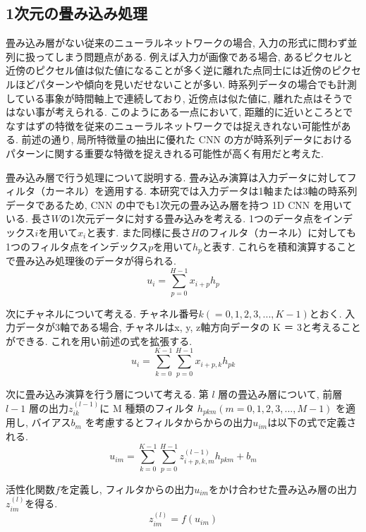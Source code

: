 \subsection{1次元の畳み込み処理}
畳み込み層がない従来のニューラルネットワークの場合, 入力の形式に問わず並列に扱ってしまう問題点がある. 例えば入力が画像である場合, あるピクセルと近傍のピクセル値は似た値になることが多く逆に離れた点同士には近傍のピクセルほどパターンや傾向を見いだせないことが多い. 時系列データの場合でも計測している事象が時間軸上で連続しており, 近傍点は似た値に, 離れた点はそうではない事が考えられる. このようにある一点において, 距離的に近いところとでなすはずの特徴を従来のニューラルネットワークでは捉えきれない可能性がある. 
前述の通り, 局所特徴量の抽出に優れた CNN の方が時系列データにおけるパターンに関する重要な特徴を捉えきれる可能性が高く有用だと考えた. 

畳み込み層で行う処理について説明する. 
畳み込み演算は入力データに対してフィルタ（カーネル）を適用する. 
本研究では入力データは1軸または3軸の時系列データであるため,  CNN の中でも1次元の畳み込み層を持つ 1D CNN を用いている. 
長さ$W$の1次元データに対する畳み込みを考える. 1つのデータ点をインデックス$i$を用いて$x_{i}$と表す. また同様に長さ$H$のフィルタ（カーネル）に対しても1つのフィルタ点をインデックス$p$を用いて$h_{p}$と表す. これらを積和演算することで畳み込み処理後のデータが得られる. 
\begin{equation}
{u_{i}=\sum_{p=0}^{H-1} x_{i+p} h_{p}}
\end{equation}

次にチャネルについて考える. 
チャネル番号$ k(= 0, 1, 2, 3, ..., K − 1)$とおく. 入力データが3軸である場合, チャネルはx, y, z軸方向データの K ＝ 3と考えることができる. これを用い前述の式を拡張する. 
\begin{equation}
{u_{i}=\sum_{k=0}^{K-1}\sum_{p=0}^{H-1} x_{i+p,k} h_{pk}}
\end{equation}

次に畳み込み演算を行う層について考える. 
第 $l$ 層の畳込み層について, 前層$l − 1$ 層の出力$z^{(l-1)}_{ik}$に M 種類のフィルタ $h_{pkm}(m =
0, 1, 2, 3, ..., M − 1)$ を適用し, バイアス$ b_{m}$ を考慮するとフィルタからからの出力$u_{im}$は以下の式で定義される. 
\begin{equation}
{u_{im}=\sum_{k=0}^{K-1}\sum_{p=0}^{H-1} z^{(l-1)}_{i+p,k,m} h_{pkm}+b_{m}}
\end{equation}

活性化関数$f$を定義し, フィルタからの出力$u_{im}$をかけ合わせた畳み込み層の出力$z^{(l)}_{im}$を得る. 
\begin{equation}
{z^{(l)}_{im}=f(u_{im})}
\end{equation}

